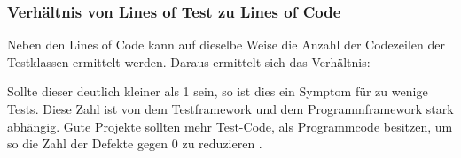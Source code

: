 \subsubsection{Verhältnis von Lines of Test zu Lines of Code}
Neben den Lines of Code kann auf dieselbe Weise die Anzahl der Codezeilen der Testklassen ermittelt werden. Daraus ermittelt sich das Verhältnis:


Sollte dieser deutlich kleiner als 1 sein, so ist dies ein Symptom für zu wenige Tests. Diese Zahl ist von dem Testframework und dem Programmframework stark abhängig. Gute Projekte sollten mehr Test-Code, als Programmcode besitzen, um so die Zahl der Defekte gegen 0 zu reduzieren \citep[S. 238]{hunt_pragmatic_1999}.

